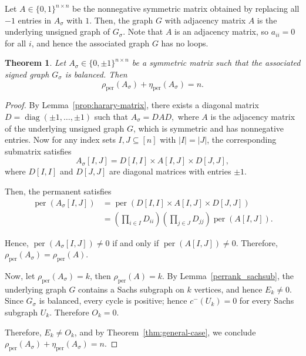 \documentclass[11pt]{article}
\theoremstyle{plain}
\newtheorem{theorem}{Theorem}[section]   %
\theoremstyle{definition}
\theoremstyle{remark}
\begin{document}
 Let \( A \in \{0,1\}^{n \times n} \) be the nonnegative symmetric matrix obtained by replacing all \(-1\) entries in \( A_\sigma \) with \( 1 \). Then, the graph \( G \) with adjacency matrix \( A\) is the underlying unsigned graph of $G_\sigma$. Note that \(A\) is an adjacency matrix, so \(a_{ii}=0\) for all \(i\), and hence the associated graph \(G\) has no loops.


\begin{theorem}\label{thm:balanced-prn}
Let \( A_\sigma \in \{0, \pm 1\}^{n \times n} \) be a symmetric matrix such that the associated signed graph \( G_\sigma \) is balanced. Then  
\[
\rho_{\operatorname{per}}(A_\sigma) + \eta_{\operatorname{per}}(A_\sigma) = n.
\]
\end{theorem}


\begin{proof}

By Lemma~\ref{prop:harary-matrix}, there exists a diagonal matrix \( D = \operatorname{diag}(\pm 1, \ldots, \pm 1) \) such that
\(
A_\sigma = D A D,
\)
where \( A \) is the adjacency matrix of the underlying unsigned graph \( G \), which is symmetric and has nonnegative entries.
Now for any index sets \( I, J \subseteq [n] \) with \( |I| = |J| \), the corresponding submatrix satisfies
\[
A_\sigma[I, J] = D[I, I] \times A[I, J] \times D[J, J],
\]
where \( D[I, I] \) and \( D[J, J] \) are diagonal matrices with entries \( \pm 1 \).

Then, the permanent satisfies
\[
\begin{aligned}
\operatorname{per}(A_\sigma[I, J]) 
&= \operatorname{per}(D[I, I] \times A[I, J] \times D[J, J]) \\
&= \left( \prod_{i \in I} D_{ii} \right) 
   \left( \prod_{j \in J} D_{jj} \right) 
   \operatorname{per}(A[I, J]).
\end{aligned}
\]

Hence, $\operatorname{per}(A_\sigma[I, J]) \ne 0$  if and only if $\operatorname{per}(A[I, J]) \ne 0$. 
Therefore,
\(
\rho_{\mathrm{per}}(A_\sigma) = \rho_{\mathrm{per}}(A).
\)

Now, let \( \rho_{\operatorname{per}}(A_\sigma) = k \), then \( \rho_{\operatorname{per}}(A) = k \). By Lemma~\ref{perrank_sachsub}, the underlying graph \( G \) contains a Sachs subgraph on \( k \) vertices, and hence \(E_k \neq 0\).
Since \(G_\sigma\) is balanced, every cycle is positive; hence \(c^-(U_k)=0\) for every
Sachs subgraph \(U_k\). Therefore \(O_k=0\).




Therefore, \( E_k \neq O_k \), and by Theorem~\ref{thm:general-case}, we conclude
\(
\rho_{\operatorname{per}}(A_\sigma) + \eta_{\operatorname{per}}(A_\sigma) = n.
\)
\end{proof}
\end{document}
